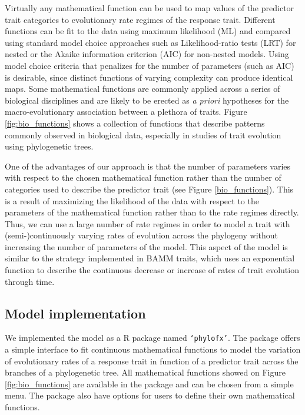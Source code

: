 Virtually any mathematical function can be used to map values of the predictor trait categories to evolutionary rate regimes of the response trait. Different functions can be fit to the data using maximum likelihood (ML) and compared using standard model choice approaches such as Likelihood-ratio tests (LRT) for nested or the Akaike information criterion (AIC) for non-nested models. Using model choice criteria that penalizes for the number of parameters (such as AIC) is desirable, since distinct functions of varying complexity can produce identical maps. Some mathematical functions are commonly applied across a series of biological disciplines and are likely to be erected as \textit{a priori} hypotheses for the macro-evolutionary association between a plethora of traits. Figure \ref{fig:bio_functions} shows a collection of functions that describe patterns commonly observed in biological data, especially in studies of trait evolution using phylogenetic trees.

One of the advantages of our approach is that the number of parameters varies with respect to the chosen mathematical function rather than the number of categories used to describe the predictor trait (see Figure \ref{bio_functions}). This is a result of maximizing the likelihood of the data with respect to the parameters of the mathematical function rather than to the rate regimes directly. Thus, we can use a large number of rate regimes in order to model a trait with  (semi-)continuously varying rates of evolution across the phylogeny without increasing the number of parameters of the model. This aspect of the model is similar to the strategy implemented in BAMM traits, which uses an exponential function to describe the continuous decrease or increase of rates of trait evolution through time. %

\subsection{Model implementation}

We implemented the model as a R package named \texttt{`phylofx'}. The package offers a simple interface to fit continuous mathematical functions to model the variation of evolutionary rates of a response trait in function of a predictor trait across the branches of a phylogenetic tree. All mathematical functions showed on Figure \ref{fig:bio_functions} are available in the package and can be chosen from a simple menu. The package also have options for users to define their own mathematical functions.


